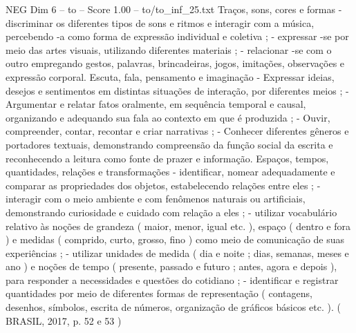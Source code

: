 \begin{textsample}{NEG Dim 6 – to – Score 1.00 – to/to\_inf\_25.txt}
Traços, sons, cores e formas - discriminar os diferentes tipos de sons e ritmos e interagir com a música, percebendo -a como forma de expressão individual e coletiva ; - expressar -se por meio das artes visuais, utilizando diferentes materiais ; - relacionar -se com o outro empregando gestos, palavras, brincadeiras, jogos, imitações, observações e expressão corporal.
Escuta, fala, pensamento e imaginação - Expressar ideias, desejos e sentimentos em distintas situações de interação, por diferentes meios ; - Argumentar e relatar fatos oralmente, em sequência temporal e causal, organizando e adequando sua fala ao contexto em que é produzida ; - Ouvir, compreender, contar, recontar e criar narrativas ; - Conhecer diferentes gêneros e portadores textuais, demonstrando compreensão da função social da escrita e reconhecendo a leitura como fonte de prazer e informação.
Espaços, tempos, quantidades, relações e transformações - identificar, nomear adequadamente e comparar as propriedades dos objetos, estabelecendo relações entre eles ; - interagir com o meio ambiente e com fenômenos naturais ou artificiais, demonstrando curiosidade e cuidado com relação a eles ; - utilizar vocabulário relativo às noções de grandeza ( maior, menor, igual etc. ), espaço ( dentro e fora ) e medidas ( comprido, curto, grosso, fino ) como meio de comunicação de suas experiências ; - utilizar unidades de medida ( dia e noite ; dias, semanas, meses e ano ) e noções de tempo ( presente, passado e futuro ; antes, agora e depois ), para responder a necessidades e questões do cotidiano ; - identificar e registrar quantidades por meio de diferentes formas de representação ( contagens, desenhos, símbolos, escrita de números, organização de gráficos básicos etc. ). ( BRASIL, 2017, p. 52 e 53 )

\end{textsample}
